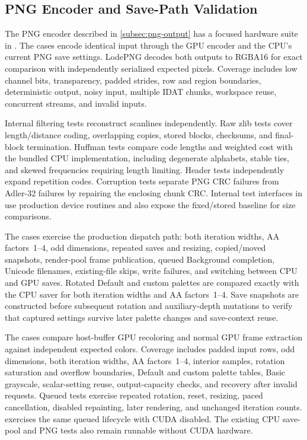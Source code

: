\subsection{PNG Encoder and Save-Path Validation}
\label{subsec:png-validation}

The PNG encoder described in \cref{subsec:png-output} has a focused
hardware suite in . The 
cases encode identical input through the GPU encoder and the CPU's
current PNG save settings. LodePNG decodes
both outputs to RGBA16 for exact comparison with independently
serialized expected pixels. Coverage includes low channel bits,
transparency, padded strides, row and region boundaries, deterministic
output, noisy input, multiple IDAT chunks, workspace reuse, concurrent
streams, and invalid inputs.

Internal filtering tests reconstruct scanlines independently. Raw zlib
tests cover length/distance coding, overlapping copies, stored blocks,
checksums, and final-block termination. Huffman tests compare code
lengths and weighted cost with the bundled CPU implementation, including
degenerate alphabets, stable ties, and skewed frequencies requiring
length limiting. Header tests independently expand repetition codes.
Corruption tests separate PNG CRC failures from Adler-32 failures by
repairing the enclosing chunk CRC. Internal test interfaces in
 use production device routines and
also expose the fixed/stored baseline for size comparisons.

The  cases exercise the production dispatch path:
both iteration widths, AA factors~1--4, odd dimensions, repeated saves
and resizing, copied/moved snapshots, render-pool frame publication,
queued Background completion, Unicode filenames, existing-file
skips, write failures, and switching between CPU and GPU saves. Rotated
Default and custom palettes are compared exactly with the CPU saver for
both iteration widths and AA factors~1--4. Save snapshots are constructed
before subsequent rotation and auxiliary-depth mutations to verify that
captured settings survive later palette changes and save-context reuse.

The  cases compare host-buffer GPU recoloring and
normal GPU frame extraction against independent expected colors. Coverage
includes padded input rows, odd dimensions, both iteration widths, AA
factors~1--4, interior samples, rotation saturation and overflow boundaries,
Default and custom palette tables, Basic grayscale, scalar-setting reuse,
output-capacity checks, and recovery after invalid requests. Queued tests
exercise repeated rotation, reset, resizing, paced cancellation, disabled
repainting, later rendering, and unchanged iteration counts.
 exercises the same queued
lifecycle with CUDA disabled. The existing CPU save-pool and PNG tests
also remain runnable without CUDA hardware.

